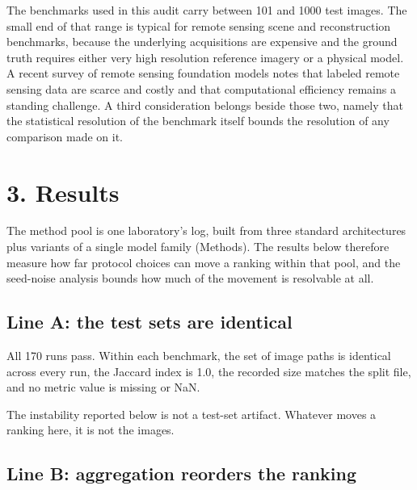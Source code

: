 \documentclass[pdflatex,sn-nature]{sn-jnl}
\begin{document}
The benchmarks used in this audit carry between 101 and 1000 test images. The small end of that range is typical for remote sensing scene and reconstruction benchmarks, because the underlying acquisitions are expensive and the ground truth requires either very high resolution reference imagery or a physical model. A recent survey of remote sensing foundation models \cite{ref8} notes that labeled remote sensing data are scarce and costly and that computational efficiency remains a standing challenge. A third consideration belongs beside those two, namely that the statistical resolution of the benchmark itself bounds the resolution of any comparison made on it.

\section{3. Results}\label{sec:results}

The method pool is one laboratory's log, built from three standard architectures plus variants of a single model family (Methods). The results below therefore measure how far protocol choices can move a ranking within that pool, and the seed-noise analysis bounds how much of the movement is resolvable at all.

\subsection{Line A: the test sets are identical}\label{sec:testsets}

All 170 runs pass. Within each benchmark, the set of image paths is identical across every run, the Jaccard index is 1.0, the recorded size matches the split file, and no metric value is missing or NaN.

The instability reported below is not a test-set artifact. Whatever moves a ranking here, it is not the images.

\subsection{Line B: aggregation reorders the ranking}\label{sec:champion}
\end{document}
